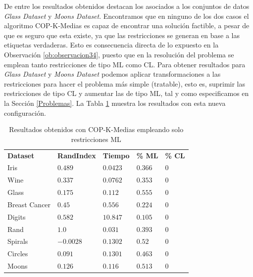 De entre los resultados obtenidos destacan los asociados a los conjuntos de datos \textit{Glass Dataset} y \textit{Moons Dataset}. Encontramos que en ninguno de los dos casos el algoritmo COP-K-Medias es capaz de encontrar una solución factible, a pesar de que es seguro que esta existe, ya que las restricciones se generan en base a las etiquetas verdaderas. Esto es consecuencia directa de lo expuesto en la Observación \ref{ob:observacion34}, puesto que en la resolución del problema se emplean tanto restricciones de tipo \acs{ML} como \acs{CL}. Para obtener resultados para \textit{Glass Dataset} y \textit{Moons Dataset} podemos aplicar transformaciones a las restricciones para hacer el problema más simple (tratable), esto es, suprimir las restricciones de tipo \acs{CL} y aumentar las de tipo \acs{ML}, tal y como especificamos en la Sección \ref{Problemas}. La Tabla \ref{tab:tabla6} muestra los resultados con esta nueva configuración.

\begin{table}[!h]
	\centering
	\setlength{\arrayrulewidth}{1mm}
	\setlength{\tabcolsep}{10pt}
	\renewcommand{\arraystretch}{0.75}
	
	\begin{tabular}{ >{\centering\arraybackslash}m{2.5cm}  >{\centering\arraybackslash}m{1.8cm}>{\centering\arraybackslash}m{1.5cm}>{\centering\arraybackslash}m{1.2cm}>{\centering\arraybackslash}m{1.2cm}}
		\hline
		\rowcolor{black}
		\multicolumn{5}{c}{\bf \color{white}{Resultados de COP-K-Medias con restricciones ML}}\\
		\hline
		\rowcolor{gray!50}
		\textbf{Dataset} & \textbf{RandIndex} & \textbf{Tiempo} & \textbf{\% ML} & \textbf{\% CL}  \\
		Iris & $0.489$ & $0.0423$ & $0.366$ & $0$ \\
		Wine & $0.337$ & $0.0762$ & $0.353$ & $0$ \\
		Glass & $0.175$ & $0.112$ & $0.555$ & $0$ \\
		Breast Cancer & $0.45$ & $0.556$ & $0.224$ & $0$ \\
		Digits & $0.582$ & $10.847$ & $0.105$ & $0$ \\
		Rand & $1.0$ & $0.031$ & $0.393$ & $0$ \\
		Spirals & $-0.0028$ & $0.1302$ & $0.52$ & $0$ \\
		Circles & $0.091$ & $0.1301$ & $0.463$ & $0$ \\
		Moons & $0.126$ & $0.116$ & $0.513$ & $0$ \\
		\hline
		
	\end{tabular}
	\caption{Resultados obtenidos con COP-K-Medias empleando solo restricciones \acs{ML}}
	\label{tab:tabla6}
\end{table}

